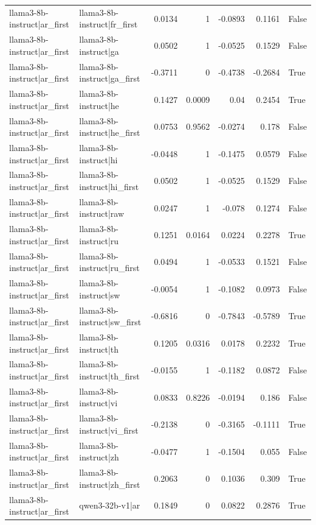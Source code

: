 \begin{table}
\begin{tabular}{l l r r r r l}
llama3-8b-instruct|ar_first & llama3-8b-instruct|fr_first & 0.0134 & 1 & -0.0893 & 0.1161 & False \\
llama3-8b-instruct|ar_first & llama3-8b-instruct|ga & 0.0502 & 1 & -0.0525 & 0.1529 & False \\
llama3-8b-instruct|ar_first & llama3-8b-instruct|ga_first & -0.3711 & 0 & -0.4738 & -0.2684 & True \\
llama3-8b-instruct|ar_first & llama3-8b-instruct|he & 0.1427 & 0.0009 & 0.04 & 0.2454 & True \\
llama3-8b-instruct|ar_first & llama3-8b-instruct|he_first & 0.0753 & 0.9562 & -0.0274 & 0.178 & False \\
llama3-8b-instruct|ar_first & llama3-8b-instruct|hi & -0.0448 & 1 & -0.1475 & 0.0579 & False \\
llama3-8b-instruct|ar_first & llama3-8b-instruct|hi_first & 0.0502 & 1 & -0.0525 & 0.1529 & False \\
llama3-8b-instruct|ar_first & llama3-8b-instruct|raw & 0.0247 & 1 & -0.078 & 0.1274 & False \\
llama3-8b-instruct|ar_first & llama3-8b-instruct|ru & 0.1251 & 0.0164 & 0.0224 & 0.2278 & True \\
llama3-8b-instruct|ar_first & llama3-8b-instruct|ru_first & 0.0494 & 1 & -0.0533 & 0.1521 & False \\
llama3-8b-instruct|ar_first & llama3-8b-instruct|sw & -0.0054 & 1 & -0.1082 & 0.0973 & False \\
llama3-8b-instruct|ar_first & llama3-8b-instruct|sw_first & -0.6816 & 0 & -0.7843 & -0.5789 & True \\
llama3-8b-instruct|ar_first & llama3-8b-instruct|th & 0.1205 & 0.0316 & 0.0178 & 0.2232 & True \\
llama3-8b-instruct|ar_first & llama3-8b-instruct|th_first & -0.0155 & 1 & -0.1182 & 0.0872 & False \\
llama3-8b-instruct|ar_first & llama3-8b-instruct|vi & 0.0833 & 0.8226 & -0.0194 & 0.186 & False \\
llama3-8b-instruct|ar_first & llama3-8b-instruct|vi_first & -0.2138 & 0 & -0.3165 & -0.1111 & True \\
llama3-8b-instruct|ar_first & llama3-8b-instruct|zh & -0.0477 & 1 & -0.1504 & 0.055 & False \\
llama3-8b-instruct|ar_first & llama3-8b-instruct|zh_first & 0.2063 & 0 & 0.1036 & 0.309 & True \\
llama3-8b-instruct|ar_first & qwen3-32b-v1|ar & 0.1849 & 0 & 0.0822 & 0.2876 & True \\

\end{tabular}
\end{table}
